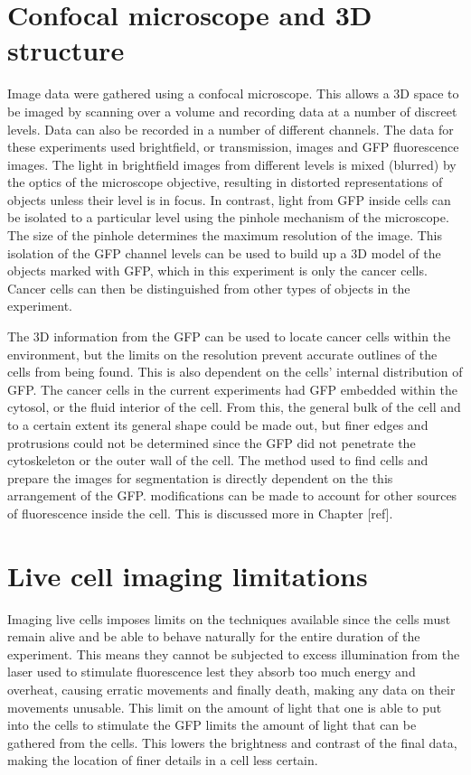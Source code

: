 \section{Confocal microscope and 3D structure}

Image data were gathered using a confocal microscope. This allows a 3D space to be imaged by scanning over a volume and recording data at a number of discreet levels. Data can also be recorded in a number of different channels. The data for these experiments used brightfield, or transmission, images and GFP fluorescence images. The light in brightfield images from different levels is mixed (blurred) by the optics of the microscope objective, resulting in distorted representations of objects unless their level is in focus. In contrast, light from GFP inside cells can be isolated to a particular level using the pinhole mechanism of the microscope. The size of the pinhole determines the maximum resolution of the image. This isolation of the GFP channel levels can be used to build up a 3D model of the objects marked with GFP, which in this experiment is only the cancer cells. Cancer cells can then be distinguished from other types of objects in the experiment.

The 3D information from the GFP can be used to locate cancer cells within the environment, but the limits on the resolution prevent accurate outlines of the cells from being found. This is also dependent on the cells' internal distribution of GFP. The cancer cells in the current experiments had GFP embedded within the cytosol, or the fluid interior of the cell. From this, the general bulk of the cell and to a certain extent its general shape could be made out, but finer edges and protrusions could not be determined since the GFP did not penetrate the cytoskeleton or the outer wall of the cell. The method used to find cells and prepare the images for segmentation is directly dependent on the this arrangement of the GFP. modifications can be made to account for other sources of fluorescence inside the cell. This is discussed more in Chapter [ref].

\section{Live cell imaging limitations}

Imaging live cells imposes limits on the techniques available since the cells must remain alive and be able to behave naturally for the entire duration of the experiment. This means they cannot be subjected to excess illumination from the laser used to stimulate fluorescence lest they absorb too much energy and overheat, causing erratic movements and finally death, making any data on their movements unusable. This limit on the amount of light that one is able to put into the cells to stimulate the GFP limits the amount of light that can be gathered from the cells. This lowers the brightness and contrast of the final data, making the location of finer details in a cell less certain.

